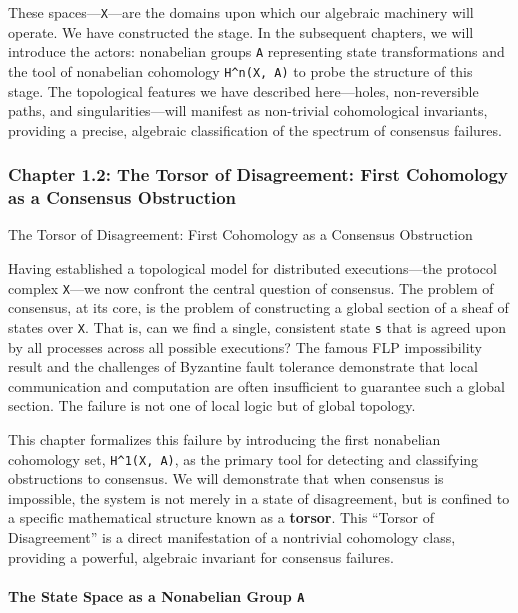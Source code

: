 \documentclass[
]{article}
\begin{document}
These spaces---\texttt{X}---are the domains upon which our algebraic
machinery will operate. We have constructed the stage. In the subsequent
chapters, we will introduce the actors: nonabelian groups \texttt{A}
representing state transformations and the tool of nonabelian cohomology
\texttt{H\^{}n(X,\ A)} to probe the structure of this stage. The
topological features we have described here---holes, non-reversible
paths, and singularities---will manifest as non-trivial cohomological
invariants, providing a precise, algebraic classification of the
spectrum of consensus failures.

\subsubsection{Chapter 1.2: The Torsor of Disagreement: First Cohomology
as a Consensus
Obstruction}\label{chapter-1.2-the-torsor-of-disagreement-first-cohomology-as-a-consensus-obstruction}

\protect{}\label{chapter-1-2-The_Torsor_of_Disagreement__First_Cohomo}{}

The Torsor of Disagreement: First Cohomology as a Consensus Obstruction

Having established a topological model for distributed executions---the
protocol complex \texttt{X}---we now confront the central question of
consensus. The problem of consensus, at its core, is the problem of
constructing a global section of a sheaf of states over \texttt{X}. That
is, can we find a single, consistent state \texttt{s} that is agreed
upon by all processes across all possible executions? The famous FLP
impossibility result and the challenges of Byzantine fault tolerance
demonstrate that local communication and computation are often
insufficient to guarantee such a global section. The failure is not one
of local logic but of global topology.

This chapter formalizes this failure by introducing the first nonabelian
cohomology set, \texttt{H\^{}1(X,\ A)}, as the primary tool for
detecting and classifying obstructions to consensus. We will demonstrate
that when consensus is impossible, the system is not merely in a state
of disagreement, but is confined to a specific mathematical structure
known as a \textbf{torsor}. This ``Torsor of Disagreement'' is a direct
manifestation of a nontrivial cohomology class, providing a powerful,
algebraic invariant for consensus failures.

\paragraph{\texorpdfstring{The State Space as a Nonabelian Group
\texttt{A}}{The State Space as a Nonabelian Group A}}\label{the-state-space-as-a-nonabelian-group-a}
\end{document}
